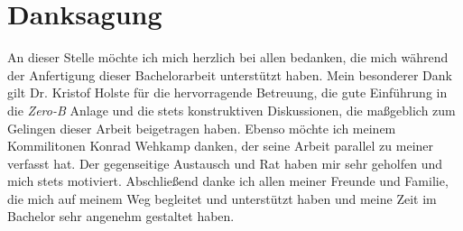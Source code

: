 \chapter*{Danksagung}
An dieser Stelle möchte ich mich herzlich bei allen bedanken, die mich während der Anfertigung dieser Bachelorarbeit unterstützt haben. Mein besonderer Dank gilt Dr. Kristof Holste für die hervorragende Betreuung, die gute Einführung in die \textit{Zero-B} Anlage und die stets konstruktiven Diskussionen, die maßgeblich zum Gelingen dieser Arbeit beigetragen haben. Ebenso möchte ich meinem Kommilitonen Konrad Wehkamp danken, der seine Arbeit parallel zu meiner verfasst hat. Der gegenseitige Austausch und Rat haben mir sehr geholfen und mich stets motiviert. Abschließend danke ich allen meiner Freunde und Familie, die mich auf meinem Weg begleitet und unterstützt haben und meine Zeit im Bachelor sehr angenehm gestaltet haben.
